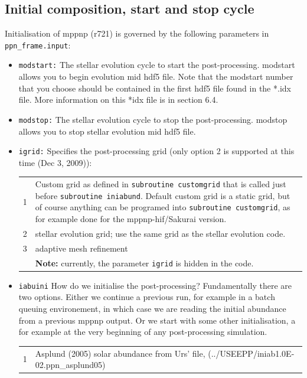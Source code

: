 \subsection{Initial composition, start and stop cycle}
 Initialisation of mppnp (r721) is governed by
the following parameters in \texttt{ppn\_frame.input}:
\begin{itemize}
\item {} \texttt{modstart:} The stellar evolution cycle
  to start the post-processing. modstart allows you to begin evolution 
  mid hdf5 file. Note that the modstart number that you choose should be 
  contained in the first hdf5 file found in the *.idx file. More 
  information on this *idx file is in section 6.4. 
\item {} \texttt{modstop:} The stellar evolution cycle to
  stop the post-processing. modstop allows you to stop stellar evolution
  mid hdf5 file.
\item {} \texttt{igrid:} Specifies the post-processing grid 
  (only option 2 is supported at this time (Dec 3, 2009)):\\
\begin{tabularx}{0.9\textwidth}{lX}
  1 & Custom grid as defined in \texttt{subroutine customgrid} that is
  called just before \texttt{subroutine iniabund}. Default custom grid
  is a static grid, but of course anything can be programed into
  \texttt{subroutine customgrid}, as for example done for the
  mppnp-hif/Sakurai version. \\
  2 & stellar evolution grid; use the same grid as the stellar evolution code.  \\
  3 & adaptive mesh refinement \\
   & {\bf Note:} currently, the parameter \texttt{igrid} is hidden in the code. \\
\end{tabularx}
\item {}\texttt{iabuini} How do we initialise the
  post-processing? Fundamentally there are two options. Either we
  continue a previous run, for example in a batch queuing
  environement, in which case we are reading the initial abundance
  from a previous mppnp output. Or we start with some other
  initialisation, a for example at the very beginning of any
  post-processing simulation.\\
\begin{tabularx}{0.9\textwidth}{lX}
1 & Asplund (2005) solar abundance from Urs' file, (../USEEPP/iniab1.0E-02.ppn\_asplund05) \\

\end{tabularx}
\end{itemize}

